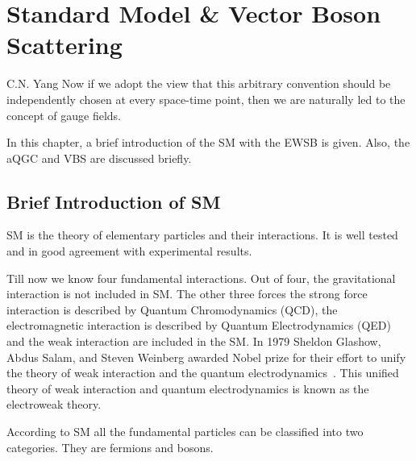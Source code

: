 \chapter{Standard Model \& Vector Boson Scattering} %
\label{cha:standard_model__vector_boson_scattering}
\begin{chapquote}
{C.N. Yang}
Now if we adopt the view that this arbitrary convention should be independently chosen at every space-time point, then we are naturally led to the concept of gauge fields.
\end{chapquote}
In this chapter, a brief introduction of the SM with the EWSB is given. Also, the aQGC and VBS are discussed briefly.
\section{Brief Introduction of SM} %
\label{sec:brief_introduction_of_sm}
SM is the theory of elementary particles and their interactions. It is well tested and in good agreement with experimental results.

Till now we know four fundamental interactions.
Out of four, the gravitational interaction is not included in SM.
The other three forces the strong force interaction is described by Quantum Chromodynamics (QCD), the electromagnetic interaction is described by Quantum Electrodynamics (QED) and the weak interaction are included in the SM.
In 1979 Sheldon Glashow, Abdus Salam, and Steven Weinberg awarded Nobel prize for their effort to unify the theory of weak interaction and the quantum electrodynamics~\cite{StandardModel67_1,StandardModel67_2}.
This unified theory of weak interaction and quantum electrodynamics is known as the electroweak theory.

According to SM all the fundamental particles can be classified into two categories. They are fermions and bosons.

